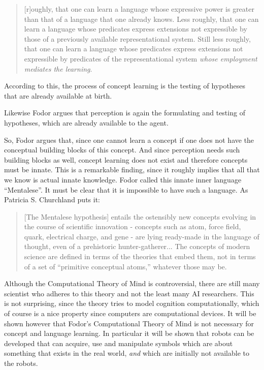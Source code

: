 
\begin{quote}
[r]oughly, that one can learn a language whose expressive power is greater than that of a language that one already knows. Less roughly, that one can learn a language whose predicates express extensions not expressible by those of a previously available representational system. Still less roughly, that one can learn a language whose predicates express extensions not expressible by predicates of the representational system {\em whose employment mediates the learning}. \cite[p. 86, Fodor's italics]{fodor:1975}
\end{quote}


According to this, the process of concept learning is the testing of hypotheses that are already available at birth.

Likewise Fodor argues that perception is again the formulating and testing of hypotheses, which are already available to the agent.


So, Fodor argues that, since one cannot learn a concept if one does not have the conceptual building blocks of this concept. And since perception needs such building blocks as well, concept learning does not exist and therefore concepts must be innate. This is a remarkable finding, since it roughly implies that all that we know is actual innate knowledge. Fodor called this innate inner language ``Mentalese''. It must be clear that it is impossible to have such a language. As Patricia S. Churchland puts it:

\begin{quote}
[The Mentalese hypothesis] entails the ostensibly new concepts evolving in the course of scientific innovation - concepts such as atom, force field, quark, electrical charge, and gene - are lying ready-made in the language of thought, even of a prehistoric hunter-gatherer... The concepts of modern science are defined in terms of the theories that embed them, not in terms of a set of ``primitive conceptual atoms,'' whatever those may be. \cite[p. 389]{p.s.churchland:1986}
\end{quote}


Although the Computational Theory of Mind is controversial, there are still many scientist who adheres to this theory and not the least many AI researchers. This is not surprising, since the theory tries to model cognition computationally, which of course is a nice property since computers are computational devices. It will be shown however that Fodor's Computational Theory of Mind is not necessary for concept and language learning. In particular it will be shown that robots can be developed that can acquire, use and manipulate symbols which are about something that exists in the real world, {\em and} which are initially not available to the robots.
	
